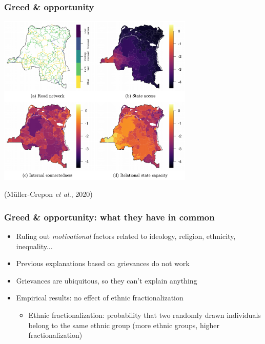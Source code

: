 \documentclass[aspectratio=43]{beamer}
\begin{document}
\begin{frame}
\frametitle{Greed \& opportunity}
\centering

\includegraphics[width = 0.7\textwidth]{img/muller-crepon}

{\small (Müller-Crepon \textit{et al.}, 2020)}

\end{frame}

\begin{frame}
\frametitle{Greed \& opportunity: what they have in common}
\centering

\begin{itemize}
  \item Ruling out \textit{motivational} factors related to ideology, religion, ethnicity, inequality...
  \item Previous explanations based on grievances do not work
  \item Grievances are ubiquitous, so they can't explain anything
  \item Empirical results: no effect of ethnic fractionalization
  \begin{itemize}
    \item Ethnic fractionalization: probability that two randomly drawn individuals belong to the same ethnic group (more ethnic groups, higher fractionalization)
  \end{itemize}
\end{itemize}

\end{frame}
\end{document}
